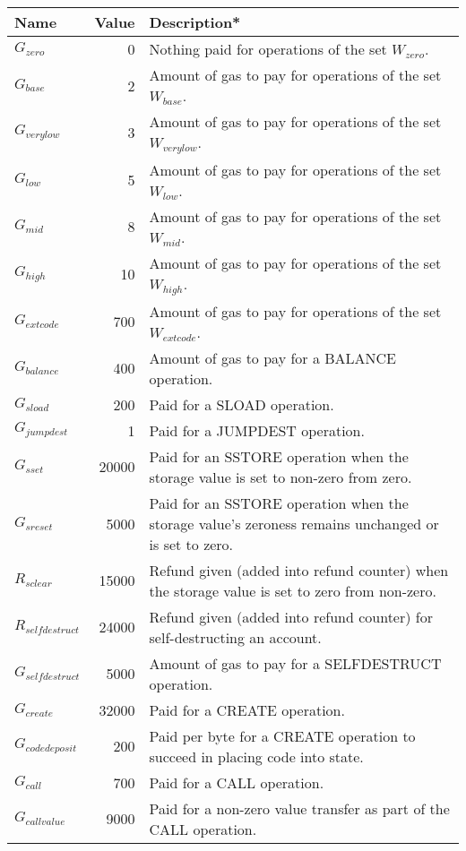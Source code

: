 \documentclass[9pt,oneside]{amsart}
\begin{document}
\begin{tabular*}{\columnwidth}[h]{lrl}
\toprule
Name & Value & Description* \\
\midrule
$G_{zero}$ & 0 & Nothing paid for operations of the set {\small $W_{zero}$}. \\
$G_{base}$ & 2 & Amount of gas to pay for operations of the set {\small $W_{base}$}. \\
$G_{verylow}$ & 3 & Amount of gas to pay for operations of the set {\small $W_{verylow}$}. \\
$G_{low}$ & 5 & Amount of gas to pay for operations of the set {\small $W_{low}$}. \\
$G_{mid}$ & 8 & Amount of gas to pay for operations of the set {\small $W_{mid}$}. \\
$G_{high}$ & 10 & Amount of gas to pay for operations of the set {\small $W_{high}$}. \\
$G_{extcode}$ & 700 & Amount of gas to pay for operations of the set {\small $W_{extcode}$}. \\
$G_{balance}$ & 400 & Amount of gas to pay for a {\small BALANCE} operation. \\
$G_{sload}$ & 200 & Paid for a {\small SLOAD} operation. \\
$G_{jumpdest}$ & 1 & Paid for a {\small JUMPDEST} operation. \\
$G_{sset}$ & 20000 & Paid for an {\small SSTORE} operation when the storage value is set to non-zero from zero. \\
$G_{sreset}$ & 5000 & Paid for an {\small SSTORE} operation when the storage value's zeroness remains unchanged or is set to zero. \\
$R_{sclear}$ & 15000 & Refund given (added into refund counter) when the storage value is set to zero from non-zero. \\
$R_{selfdestruct}$ & 24000 & Refund given (added into refund counter) for self-destructing an account. \\
$G_{selfdestruct}$ & 5000 & Amount of gas to pay for a {\small SELFDESTRUCT} operation. \\
$G_{create}$ & 32000 & Paid for a {\small CREATE} operation. \\
$G_{codedeposit}$ & 200 & Paid per byte for a {\small CREATE} operation to succeed in placing code into state. \\
$G_{call}$ & 700 & Paid for a {\small CALL} operation. \\
$G_{callvalue}$ & 9000 & Paid for a non-zero value transfer as part of the {\small CALL} operation. \\

\end{tabular*}
\end{document}
